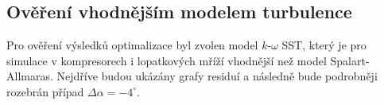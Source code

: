 %


\subsection{Ověření vhodnějším modelem turbulence}

Pro ověření výsledků optimalizace byl zvolen model $k\text{-}\omega$ SST, který je pro simulace v kompresorech i lopatkových mříží vhodnější než model Spalart-Allmaras. Nejdříve budou ukázány grafy residuí a následně bude podrobněji rozebrán případ $ \Delta \alpha = -4^\circ $.

